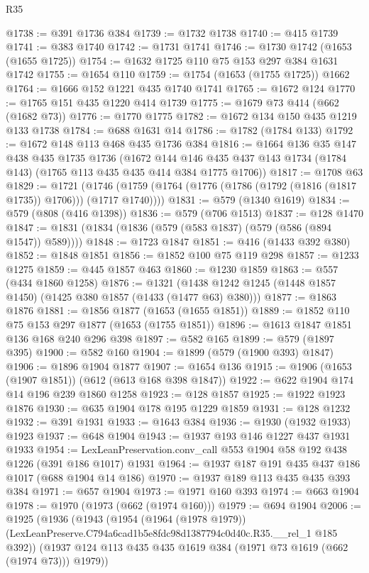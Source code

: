 \begin{lexlean}{R35}
\begin{coremodule}
@1738 := @391 @1736 @384
@1739 := @1732 @1738
@1740 := @415 @1739
@1741 := @383 @1740
@1742 := @1731 @1741
@1746 := @1730 @1742 (@1653 (@1655 @1725))
@1754 := @1632 @1725 @110 @75 @153 @297 @384 @1631 @1742
@1755 := @1654 @110
@1759 := @1754 (@1653 (@1755 @1725)) @1662
@1764 := @1666 @152 @1221 @435 @1740 @1741
@1765 := @1672 @124
@1770 := @1765 @151 @435 @1220 @414 @1739
@1775 := @1679 @73 @414 (@662 (@1682 @73))
@1776 := @1770 @1775
@1782 := @1672 @134 @150 @435 @1219 @133 @1738
@1784 := @688 @1631 @14
@1786 := @1782 (@1784 @133)
@1792 := @1672 @148 @113 @468 @435 @1736 @384
@1816 := @1664
    @136
    @35
    @147
    @438
    @435
    @1735
    @1736
    (@1672 @144 @146 @435 @437 @143 @1734 (@1784 @143) (@1765 @113 @435 @435 @414 @384 @1775 @1706))
@1817 := @1708 @63
@1829 := @1721
    (@1746 (@1759 (@1764 (@1776 (@1786 (@1792 (@1816 (@1817 @1735)) @1706))) (@1717 @1740))))
@1831 := @579 (@1340 @1619)
@1834 := @579 (@808 (@416 @1398))
@1836 := @579 (@706 @1513)
@1837 := @128 @1470
@1847 := @1831 (@1834 (@1836 (@579 (@583 @1837) (@579 (@586 (@894 @1547)) @589))))
@1848 := @1723 @1847
@1851 := @416 (@1433 @392 @380)
@1852 := @1848 @1851
@1856 := @1852 @100 @75 @119 @298
@1857 := @1233 @1275
@1859 := @445 @1857 @463
@1860 := @1230 @1859
@1863 := @557 (@434 @1860 @1258)
@1876 := @1321 (@1438 @1242 @1245 (@1448 @1857 @1450) (@1425 @380 @1857 (@1433 (@1477 @63) @380)))
@1877 := @1863 @1876
@1881 := @1856 @1877 (@1653 (@1655 @1851))
@1889 := @1852 @110 @75 @153 @297 @1877 (@1653 (@1755 @1851))
@1896 := @1613 @1847 @1851 @136 @168 @240 @296 @398
@1897 := @582 @165
@1899 := @579 (@1897 @395)
@1900 := @582 @160
@1904 := @1899 (@579 (@1900 @393) @1847)
@1906 := @1896 @1904 @1877
@1907 := @1654 @136
@1915 := @1906 (@1653 (@1907 @1851)) (@612 (@613 @168 @398 @1847))
@1922 := @622 @1904 @174 @14 @196 @239 @1860 @1258
@1923 := @128 @1857
@1925 := @1922 @1923 @1876
@1930 := @635 @1904 @178 @195 @1229 @1859
@1931 := @128 @1232
@1932 := @391 @1931
@1933 := @1643 @384
@1936 := @1930 (@1932 @1933) @1923
@1937 := @648 @1904
@1943 := @1937 @193 @146 @1227 @437 @1931 @1933
@1954 := LexLeanPreservation.conv_call @553 @1904 @58 @192 @438 @1226 (@391 @186 @1017) @1931
@1964 := @1937 @187 @191 @435 @437 @186 @1017 (@688 @1904 @14 @186)
@1970 := @1937 @189 @113 @435 @435 @393 @384
@1971 := @657 @1904
@1973 := @1971 @160 @393
@1974 := @663 @1904
@1978 := @1970 (@1973 (@662 (@1974 @160)))
@1979 := @694 @1904
@2006 := @1925
    (@1936
      (@1943
        (@1954
          (@1964 (@1978 @1979))
          (LexLeanPreserve.C794a6cad1b5e8fdc98d1387794c0d40c.R35.__rel_1 @185 @392))
        (@1937 @124 @113 @435 @435 @1619 @384 (@1971 @73 @1619 (@662 (@1974 @73))) @1979))

\end{coremodule}
\end{lexlean}
